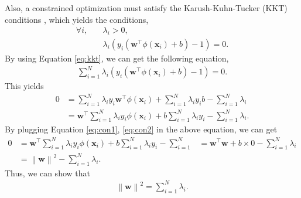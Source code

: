 \documentclass[journal,onecolumn,12pt]{IEEEtran}
\newcommand{\norm}[1]{\left\lVert#1\right\rVert}
\begin{document}
Also, a constrained optimization must satisfy the Karush-Kuhn-Tucker (KKT) conditions \cite{bishop}, which yields the conditions, 
\begin{equation}
\begin{aligned}
\forall i, \quad & \lambda_i >0, \\
& \lambda_i \left({y_i (\boldsymbol{w}^\top {\phi} (\boldsymbol{x}_i) + b)} - 1\right) = 0.
\end{aligned}
\label{eq:kkt}
\end{equation}
By using Equation \ref{eq:kkt}, we can get the following equation,
\begin{equation}
\begin{aligned}
\sum_{i=1}^{N} \lambda_i \left({y_i (\boldsymbol{w}^\top {\phi} (\boldsymbol{x}_i) + b)} - 1\right)=0.
\end{aligned}
\end{equation}
This yields
\begin{equation}
\begin{aligned}
0 & = \sum_{i=1}^{N} \lambda_i y_i \boldsymbol{w}^\top {\phi} (\boldsymbol{x}_i) + \sum_{i=1}^{N} \lambda_i y_i b - \sum_{i=1}^{N}\lambda_i\\
& = \boldsymbol{w}^\top \sum_{i=1}^{N} \lambda_i y_i {\phi} (\boldsymbol{x}_i) + b \sum_{i=1}^{N} \lambda_i y_i - \sum_{i=1}^{N} \lambda_i.
\end{aligned}
\end{equation}
By plugging Equation \ref{eq:con1}, \ref{eq:con2} in the above equation, we can get
\begin{equation}
\begin{aligned}
0 &= \boldsymbol{w}^\top \sum_{i=1}^{N} \lambda_i y_i {\phi} (\boldsymbol{x}_i) + b \sum_{i=1}^{N} \lambda_i y_i - \sum_{i=1}^{N}
&= \boldsymbol{w}^\top \boldsymbol{w} + b \times 0 - \sum_{i=1}^{N} \lambda_i\\
&= \norm{\boldsymbol{w}}^2 - \sum_{i=1}^{N} \lambda_i.
\end{aligned}
\end{equation}
Thus, we can show that
\begin{equation}
\begin{aligned}
\norm{\boldsymbol{w}}^2 = \sum_{i=1}^{N} \lambda_i.
\end{aligned}
\end{equation}

\pagebreak
\end{document}
